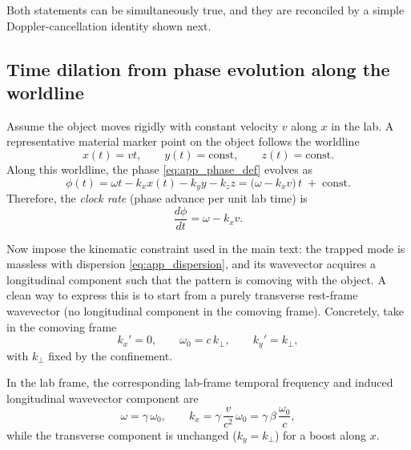 \documentclass[11pt]{article}
\begin{document}
Both statements can be simultaneously true, and they are reconciled by a simple
Doppler-cancellation identity shown next.

\subsection{Time dilation from phase evolution along the worldline}
\label{app:standing_wave_time_dilation}

Assume the object moves rigidly with constant velocity $v$ along $x$ in the lab.
A representative material marker point on the object follows the worldline
\begin{equation}
x(t)=v t,\qquad y(t)=\text{const},\qquad z(t)=\text{const}.
\label{eq:app_worldline}
\end{equation}
Along this worldline, the phase \eqref{eq:app_phase_def} evolves as
\begin{equation}
\phi(t) = \omega t - k_x x(t) - k_y y - k_z z
= \big(\omega - k_x v\big)\,t \;+\; \text{const}.
\label{eq:app_phase_along_worldline}
\end{equation}
Therefore, the \emph{clock rate} (phase advance per unit lab time) is
\begin{equation}
\frac{d\phi}{dt} = \omega - k_x v.
\label{eq:app_phase_rate_dt}
\end{equation}

Now impose the kinematic constraint used in the main text: the trapped mode is
massless with dispersion \eqref{eq:app_dispersion}, and its wavevector acquires
a longitudinal component such that the pattern is comoving with the object.
A clean way to express this is to start from a purely transverse rest-frame
wavevector (no longitudinal component in the comoving frame). Concretely, take
in the comoving frame
\begin{equation}
k_x' = 0,\qquad \omega_0 = c\,k_\perp,\qquad k_y' = k_\perp,
\label{eq:app_rest_frame_transverse_mode}
\end{equation}
with $k_\perp$ fixed by the confinement.

In the lab frame, the corresponding lab-frame temporal frequency and induced
longitudinal wavevector component are
\begin{equation}
\omega = \gamma\,\omega_0,
\qquad
k_x = \gamma\,\frac{v}{c^2}\,\omega_0
= \gamma\,\beta\,\frac{\omega_0}{c},
\label{eq:app_boosted_components}
\end{equation}
while the transverse component is unchanged ($k_y=k_\perp$) for a boost along
$x$.
\end{document}
